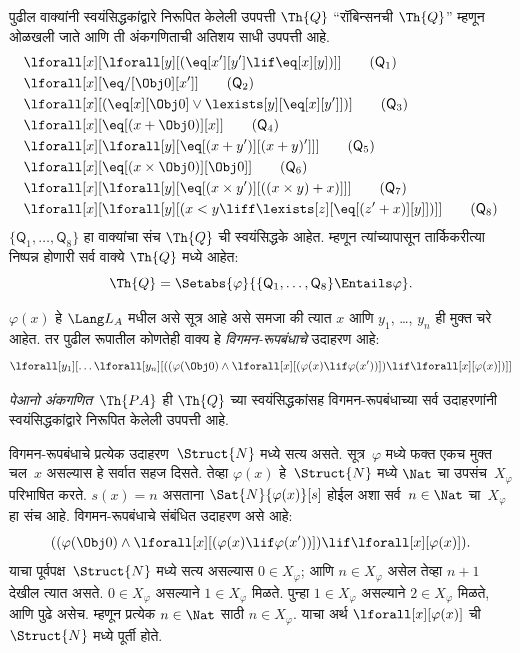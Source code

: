 \begin{defn}
पुढील वाक्यांनी स्वयंसिद्धकांद्वारे निरूपित केलेली उपपत्ती
$\Th{Q}$ ``रॉबिन्सनची $\Th{Q}$'' म्हणून ओळखली जाते आणि ती
अंकगणिताची अतिशय साधी उपपत्ती आहे.
\begin{align*}
& \lforall[x][\lforall[y][(\eq[x'][y'] \lif \eq[x][y])]] \tag{$\mathsf{Q}_1$}\\
& \lforall[x][\eq/[\Obj 0][x']] \tag{$\mathsf{Q}_2$}\\
& \lforall[x][(\eq[x][\Obj 0] \lor \lexists[y][\eq[x][y']])] \tag{$\mathsf{Q}_3$}\\
& \lforall[x][\eq[(x + \Obj 0)][x]] \tag{$\mathsf{Q}_4$}\\
& \lforall[x][\lforall[y][\eq[(x + y')][(x + y)']]] \tag{$\mathsf{Q}_5$}\\
& \lforall[x][\eq[(x \times \Obj 0)][\Obj 0]] \tag{$\mathsf{Q}_6$}\\
& \lforall[x][\lforall[y][\eq[(x \times y')][((x \times y) + x)]]] \tag{$\mathsf{Q}_7$}\\
& \lforall[x][\lforall[y][(x < y \liff \lexists[z][\eq[(z' + x)][y]])]] \tag{$\mathsf{Q}_8$}
\end{align*}
$\{\mathsf{Q}_1, \dots, \mathsf{Q}_8\}$ हा वाक्यांचा संच $\Th{Q}$ ची
स्वयंसिद्धके आहेत. म्हणून त्यांच्यापासून तार्किकरीत्या निष्पन्न होणारी सर्व
वाक्ये $\Th{Q}$ मध्ये आहेत:
\[\Th{Q} = \Setabs{\varphi}{\{\mathsf{Q}_1, \dots, \mathsf{Q}_8\} \Entails \varphi}.
\]
\end{defn}

\begin{defn}
$\varphi(x)$ हे $\Lang L_A$ मधील असे सूत्र आहे असे समजा की
त्यात $x$ आणि $y_1$, \dots, $y_n$ ही मुक्त चरे आहेत. तर पुढील
रूपातील कोणतेही वाक्य हे \emph{विगमन-रूपबंधाचे} उदाहरण आहे:
\[\lforall[y_1][\dots\lforall[y_n][((\varphi(\Obj 0) \land \lforall[x][(\varphi(x)
\lif \varphi(x'))]) \lif \lforall[x][\varphi(x)])]]
\]

\emph{पेआनो अंकगणित}~$\Th{PA}$ ही $\Th{Q}$ च्या स्वयंसिद्धकांसह
विगमन-रूपबंधाच्या सर्व उदाहरणांनी स्वयंसिद्धकांद्वारे निरूपित
केलेली उपपत्ती आहे.
\end{defn}

\begin{explain}
विगमन-रूपबंधाचे प्रत्येक उदाहरण~$\Struct{N}$ मध्ये सत्य असते.
सूत्र~$\varphi$ मध्ये फक्त एकच मुक्त चल~$x$ असल्यास
हे सर्वात सहज दिसते. तेव्हा $\varphi(x)$ हे~$\Struct{N}$ मध्ये
$\Nat$ चा उपसंच~$X_{\varphi}$ परिभाषित करते. $s(x) = n$ असताना
$\Sat{N}{\varphi(x)}[s]$ होईल अशा सर्व~$n \in \Nat$ चा~$X_{\varphi}$ हा संच आहे.
विगमन-रूपबंधाचे संबंधित उदाहरण असे आहे:
\[((\varphi(\Obj 0) \land \lforall[x][(\varphi(x) \lif \varphi(x'))]) \lif
  \lforall[x][\varphi(x)]).
\]
याचा पूर्वपक्ष~$\Struct{N}$ मध्ये सत्य असल्यास $0 \in X_{\varphi}$;
आणि $n \in X_{\varphi}$ असेल तेव्हा $n+1$ देखील त्यात असते.
$0 \in X_{\varphi}$ असल्याने $1 \in X_{\varphi}$ मिळते. पुन्हा
$1 \in X_{\varphi}$ असल्याने $2 \in X_{\varphi}$ मिळते, आणि पुढे असेच.
म्हणून प्रत्येक
$n \in \Nat$ साठी $n \in X_{\varphi}$. याचा अर्थ
$\lforall[x][\varphi(x)]$ ची~$\Struct{N}$ मध्ये पूर्ती होते.
\end{explain}

